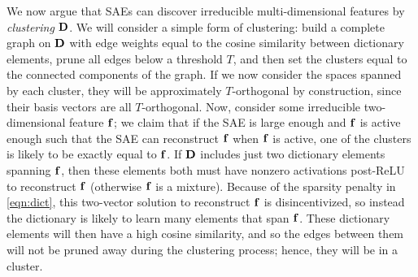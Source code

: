 \documentclass{article} %
\DeclareRobustCommand{\revOne}[1]{#1}
\theoremstyle{plain}
\theoremstyle{definition}
\begin{document}



We now argue that SAEs can discover irreducible multi-dimensional features by \textit{clustering} ${\mathbf D}$. We will consider a simple form of clustering: build a complete graph on ${\mathbf D}$ with edge weights equal to the cosine similarity between dictionary elements, prune all edges below a threshold $T$, and then set the clusters equal to the connected components of the graph. If we now consider the spaces spanned by each cluster, they will be approximately $T$-orthogonal by construction, since their basis vectors are all $T$-orthogonal. Now, consider some irreducible two-dimensional feature ${\mathbf f}$; we claim that \revOne{if the SAE is large enough and ${\mathbf f}$ is active enough such that the SAE can reconstruct ${\mathbf f}$ when ${\mathbf f}$ is active}, one of the clusters is likely to be exactly equal to ${\mathbf f}$. If ${\mathbf D}$ includes just two dictionary elements spanning ${\mathbf f}$, then these elements both must have nonzero activations post-ReLU to reconstruct ${\mathbf f}$ (otherwise ${\mathbf f}$ is a mixture). Because of the sparsity penalty in \cref{eqn:dict}, this two-vector solution to reconstruct ${\mathbf f}$ is disincentivized, so instead the dictionary is likely to learn many elements that span ${\mathbf f}$. These dictionary elements will then have a high cosine similarity, and so the edges between them will not be pruned away during the clustering process; hence, they will be in a cluster.


\end{document}
